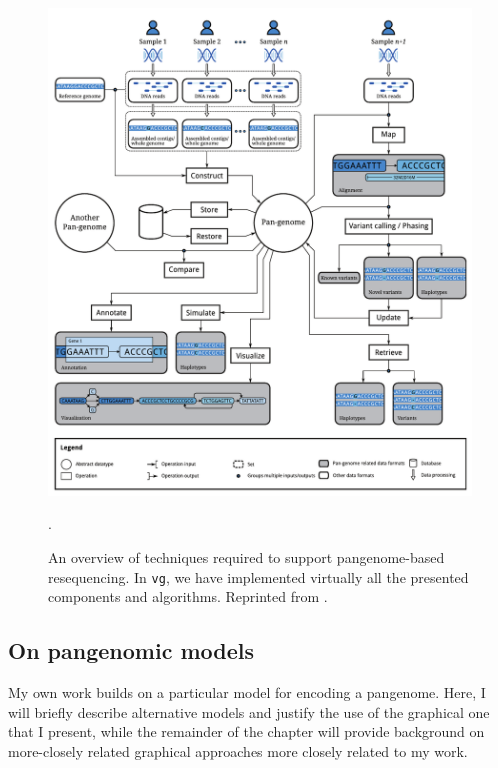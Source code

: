 \begin{figure}[htbp!]
  \centering
  \includegraphics[width=1.0\textwidth]{Chapter1/Figs/cpang_fig2.pdf}
  \caption[Computational pangenomics]{
    An overview of techniques required to support pangenome-based resequencing.
    In {\tt vg}, we have implemented virtually all the presented components and algorithms.
    Reprinted from \cite{computational2016computational}.
    } 
\label{fig:pangenomic_processes}.
\end{figure}



\subsection{On pangenomic models}

\label{sec:on_pangenomic_models}

My own work builds on a particular model for encoding a pangenome.
Here, I will briefly describe alternative models and justify the use of the graphical one that I present, while the remainder of the chapter will provide background on more-closely related graphical approaches more closely related to my work.


